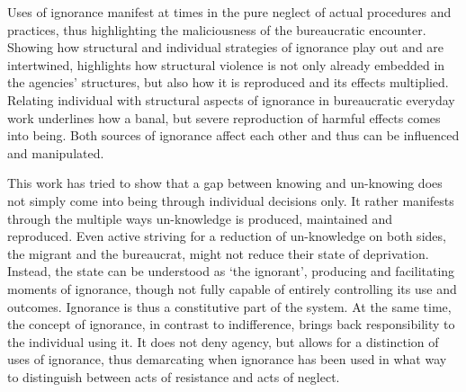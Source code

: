 Uses of ignorance manifest at times in the pure neglect of actual procedures and practices, thus highlighting the maliciousness of the bureaucratic encounter. Showing how structural and individual strategies of ignorance play out and are intertwined, highlights how structural violence is not only already embedded in the agencies’ structures, but also how it is reproduced and its effects multiplied. Relating individual with structural aspects of ignorance in bureaucratic everyday work underlines how a banal, but severe reproduction of harmful effects comes into being. Both sources of ignorance affect each other and thus can be influenced and manipulated.
\par
This work has tried to show that a gap between knowing and un-knowing does not simply come into being through individual decisions only. It rather manifests through the multiple ways un-knowledge is produced, maintained and reproduced. Even active striving for a reduction of un-knowledge on both sides, the migrant and the bureaucrat, might not reduce their state of deprivation. Instead, the state can be understood as ‘the ignorant’, producing and facilitating moments of ignorance, though not fully capable of entirely controlling its use and outcomes. Ignorance is thus a constitutive part of the system. At the same time, the concept of ignorance, in contrast to indifference, brings back responsibility to the individual using it. It does not deny agency, but allows for a distinction of uses of ignorance, thus demarcating when ignorance has been used in what way to distinguish between acts of resistance and acts of neglect.